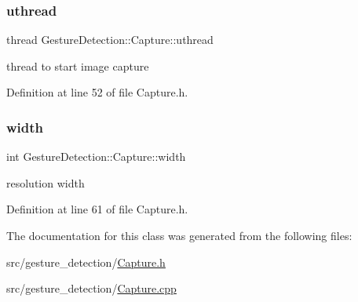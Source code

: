 \subsubsection{\texorpdfstring{uthread}{uthread}}
{\footnotesize\ttfamily thread Gesture\+Detection\+::\+Capture\+::uthread\hspace{0.3cm}{\ttfamily [private]}}



thread to start image capture 



Definition at line 52 of file Capture.\+h.

\mbox{\label{class_gesture_detection_1_1_capture_ad3a6d053234b05f0d5004014f8c74f9f}} 
\subsubsection{\texorpdfstring{width}{width}}
{\footnotesize\ttfamily int Gesture\+Detection\+::\+Capture\+::width\hspace{0.3cm}{\ttfamily [private]}}



resolution width 



Definition at line 61 of file Capture.\+h.



The documentation for this class was generated from the following files\+:\begin{DoxyCompactItemize}
\item 
src/gesture\+\_\+detection/\hyperlink{_capture_8h}{Capture.\+h}\item 
src/gesture\+\_\+detection/\hyperlink{_capture_8cpp}{Capture.\+cpp}\end{DoxyCompactItemize}
